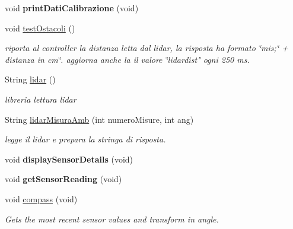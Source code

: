 \begin{DoxyCompactItemize}
\mbox{\label{ari_pi__2_d_c__esp__08_8ino_abbdedc0823a18fd32dee96e0acad447e}} 
void {\bfseries print\+Dati\+Calibrazione} (void)
\item 
void \mbox{\hyperlink{ari_pi__2_d_c__esp__08_8ino_a6f20cd3646bc1f8af9a4f9d5e45f5c90}{test\+Ostacoli}} ()
\begin{DoxyCompactList}\small\item\em riporta al controller la distanza letta dal lidar, la risposta ha formato \char`\"{}mis;\char`\"{} + distanza in cm\char`\"{}.
aggiorna anche la il valore \char`\"{}lidardist" ogni 250 ms. \end{DoxyCompactList}\item 
String \mbox{\hyperlink{ari_pi__2_d_c__esp__08_8ino_a23abf4b5bc87f963b0270c015e379872}{lidar}} ()
\begin{DoxyCompactList}\small\item\em libreria lettura lidar \end{DoxyCompactList}\item 
String \mbox{\hyperlink{ari_pi__2_d_c__esp__08_8ino_a0f6c65484953fd460fd89ee3a1a3825e}{lidar\+Misura\+Amb}} (int numero\+Misure, int ang)
\begin{DoxyCompactList}\small\item\em legge il lidar e prepara la stringa di risposta. \end{DoxyCompactList}\item 
\mbox{\label{ari_pi__2_d_c__esp__08_8ino_ac3a1af41d00b96587bf75bad54078a1f}} 
void {\bfseries display\+Sensor\+Details} (void)
\item 
\mbox{\label{ari_pi__2_d_c__esp__08_8ino_a5b51c469eb312609df7a037c33bde58d}} 
void {\bfseries get\+Sensor\+Reading} (void)
\item 
void \mbox{\hyperlink{ari_pi__2_d_c__esp__08_8ino_ada2502f03f6e1fe62fef80b03f317b98}{compass}} (void)
\begin{DoxyCompactList}\small\item\em Gets the most recent sensor values and transform in angle. \end{DoxyCompactList}\end{DoxyCompactItemize}
